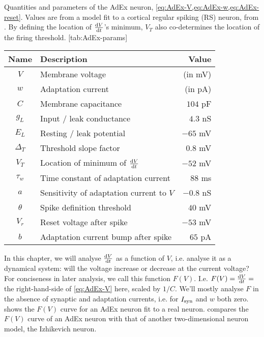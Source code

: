 \begin{table}[h]
    \vspace*{2em} %
    \begin{sidecaption}
        {Quantities and parameters of the AdEx neuron, \cref{eq:AdEx-V,eq:AdEx-w,eq:AdEx-reset}. Values are from a model fit to a cortical regular spiking (RS) neuron, from \cite{Naud2008FiringPatternsAdaptive}. By defining the location of $\frac{\mathrm{d}V}{\mathrm{d}t}$'s minimum, $V_T$ also co-determines the location of the firing threshold.}
        [tab:AdEx-params]
        \begin{tabular}{c l r}
            Name  & Description & Value \\
            \hline
            $V$  & Membrane voltage & (in mV) \\
            $w$   & Adaptation current & (in pA) \\
            $C$ & Membrane capacitance & $104$ pF \\
            $g_L$ & Input / leak conductance & $4.3$ nS \\
            $E_L$  & Resting / leak potential & $-65$ mV \\
            $Δ_T$  & Threshold slope factor & $0.8$ mV \\
            $V_T$  & Location of minimum of $\frac{\mathrm{d}V}{\mathrm{d}t}$ & $-52$ mV \\
            $τ_w$   & Time constant of adaptation current & $88$ ms \\
            $a$ & Sensitivity of adaptation current to $V$ & $-0.8$ nS \\
            $θ$ & Spike definition threshold & $40$ mV \\
            $V_r$  & Reset voltage after spike & $-53$ mV \\
            $b$ & Adaptation current bump after spike & $65$ pA
        \end{tabular}
    \end{sidecaption}
    \vspace*{1em}
\end{table}

In this chapter, we will analyse $\frac{\mathrm{d}V}{\mathrm{d}t}$ as a function of $V$, i.e. analyse it as a dynamical system: will the voltage increase or decrease at the current voltage?
For conciseness in later analysis, we call this function $F(V)$. I.e. $F(V) = \frac{\mathrm{d}V}{\mathrm{d}t} =$ the right-hand-side of \cref{eq:AdEx-V} here, scaled by $1/ C$. We'll mostly analyse $F$ in the absence of synaptic and adaptation currents, i.e. for $I_{\text{syn}}$ and $w$ both zero.
 shows the $F(V)$ curve for an AdEx neuron fit to a real neuron.  compares the $F(V)$ curve of an AdEx neuron  with that of another two-dimensional neuron model, the Izhikevich neuron.

